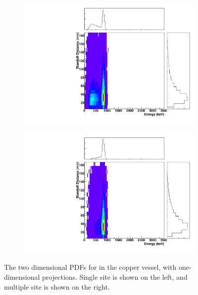 \documentclass[herrin-thesis.tex]{subfiles}
\begin{document}
\begin{figure}[hp]
\centering
	\begin{subfigure}[b]{0.48\textwidth}
	\centering
	\includegraphics[width=\textwidth]{./plots/PDFs/analysis_pdf_AllVessel_Mn54_ss.pdf}
\end{subfigure}\hfill%
\begin{subfigure}[b]{0.48\textwidth}
	\centering
	\includegraphics[width=1\textwidth]{./plots/PDFs/analysis_pdf_AllVessel_Mn54_ms.pdf}
	\end{subfigure}
\caption[PDF for  in the TPC vessel]{The two dimensional PDFs for  in the copper vessel, with one-dimensional projections. Single site is shown on the left, and multiple site is shown on the right.}
\label{fig:analysis_pdf_AllVessel_Mn54}
\end{figure}
\end{document}
